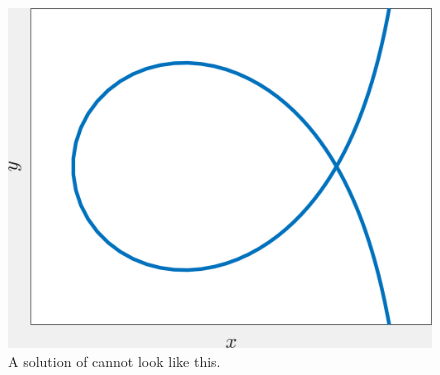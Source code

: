 \begin{figure}[!!!h!!!tb]
\centering
\includegraphics[width=\ttp]{../Pictures/Trisectrix.png}
\caption{\label{Trisectrix} A solution of  cannot look like this.}
\end{figure}


